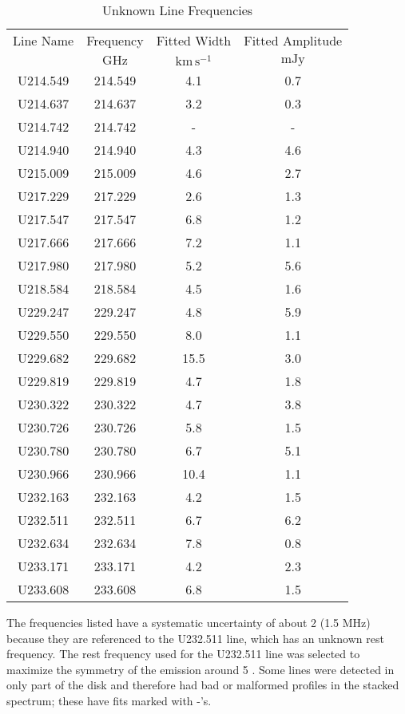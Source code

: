 \begin{table*}[htp]
\centering
\caption{Unknown Line Frequencies}
\begin{tabular}{cccc}
\label{tab:unknown_line_frequencies}
Line Name & Frequency & Fitted Width & Fitted Amplitude \\
 & $\mathrm{GHz}$ & $\mathrm{km\,s^{-1}}$ & $\mathrm{mJy}$ \\
\hline
U214.549 & 214.549 & 4.1 & 0.7 \\
U214.637 & 214.637 & 3.2 & 0.3 \\
U214.742 & 214.742 & - & - \\
U214.940 & 214.940 & 4.3 & 4.6 \\
U215.009 & 215.009 & 4.6 & 2.7 \\
U217.229 & 217.229 & 2.6 & 1.3 \\
U217.547 & 217.547 & 6.8 & 1.2 \\
U217.666 & 217.666 & 7.2 & 1.1 \\
U217.980 & 217.980 & 5.2 & 5.6 \\
U218.584 & 218.584 & 4.5 & 1.6 \\
U229.247 & 229.247 & 4.8 & 5.9 \\
U229.550 & 229.550 & 8.0 & 1.1 \\
U229.682 & 229.682 & 15.5 & 3.0 \\
U229.819 & 229.819 & 4.7 & 1.8 \\
U230.322 & 230.322 & 4.7 & 3.8 \\
U230.726 & 230.726 & 5.8 & 1.5 \\
U230.780 & 230.780 & 6.7 & 5.1 \\
U230.966 & 230.966 & 10.4 & 1.1 \\
U232.163 & 232.163 & 4.2 & 1.5 \\
U232.511 & 232.511 & 6.7 & 6.2 \\
U232.634 & 232.634 & 7.8 & 0.8 \\
U233.171 & 233.171 & 4.2 & 2.3 \\
U233.608 & 233.608 & 6.8 & 1.5 \\
\hline
\end{tabular}

\par The frequencies listed have a systematic uncertainty of about 2 \kms (1.5 MHz) because they are referenced to the U232.511 line, which has an unknown rest frequency.  The rest frequency used for the U232.511 line was selected to maximize the symmetry of the emission around 5 \kms.  Some lines were detected in only part of the disk and therefore had bad or malformed profiles in the stacked spectrum; these have fits marked with -'s.
\end{table*}
